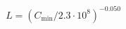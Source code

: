 \documentclass[preview]{standalone}
\begin{document}
\begin{align*}
L = (C_{\min}/2.3 \cdot 10^{8})^{-0.050}
\end{align*}
\end{document}
